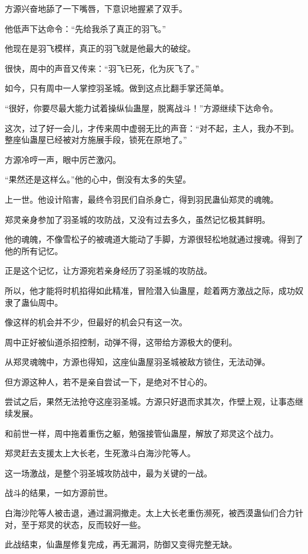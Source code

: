 \begin{this_body}
方源兴奋地舔了一下嘴唇，下意识地握紧了双手。

他低声下达命令：“先给我杀了真正的羽飞。”

他现在是羽飞模样，真正的羽飞就是他最大的破绽。

很快，周中的声音又传来：“羽飞已死，化为灰飞了。”

如今，只有周中一人掌控羽圣城。做到这点比翻手掌还简单。

“很好，你要尽最大能力试着操纵仙蛊屋，脱离战斗！”方源继续下达命令。

这次，过了好一会儿，才传来周中虚弱无比的声音：“对不起，主人，我办不到。整座仙蛊屋已经被对方施展手段，锁死在原地了。”

方源冷哼一声，眼中厉芒激闪。

“果然还是这样么。”他的心中，倒没有太多的失望。

上一世。他设计陷害，最终令羽民们自杀身亡，得到羽民蛊仙郑灵的魂魄。

郑灵亲身参加了羽圣城的攻防战，又没有过去多久，虽然记忆极其鲜明。

他的魂魄，不像雪松子的被魂道大能动了手脚，方源很轻松地就通过搜魂。得到了他的所有记忆。

正是这个记忆，让方源宛若亲身经历了羽圣城的攻防战。

所以，他才能将时机掐得如此精准，冒险潜入仙蛊屋，趁着两方激战之际，成功奴隶了蛊仙周中。

像这样的机会并不少，但最好的机会只有这一次。

周中正好被仙道杀招控制，动弹不得，这带给方源极大的便利。

从郑灵魂魄中，方源也得知，这座仙蛊屋羽圣城被敌方锁住，无法动弹。

但方源这种人，若不是亲自尝试一下，是绝对不甘心的。

尝试之后，果然无法抢夺这座羽圣城。方源只好退而求其次，作壁上观，让事态继续发展。

和前世一样，周中拖着重伤之躯，勉强接管仙蛊屋，解放了郑灵这个战力。

郑灵赶去支援太上大长老，生死激斗白海沙陀等人。

这一场激战，是整个羽圣城攻防战中，最为关键的一战。

战斗的结果，一如方源前世。

白海沙陀等人被击退，通过漏洞撤走。太上大长老重伤濒死，被西漠蛊仙们合力针对，至于郑灵的状态，反而较好一些。

此战结束，仙蛊屋修复完成，再无漏洞，防御又变得完整无缺。


\end{this_body}
